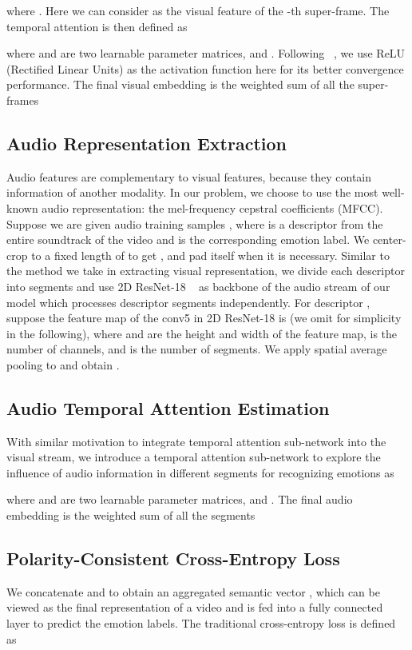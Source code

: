 \documentclass[letterpaper]{article} \usepackage{aaai20}  \usepackage{times}  \usepackage{helvet} \usepackage{courier}  \usepackage[hyphens]{url}  \usepackage{graphicx} \urlstyle{rm} \def\UrlFont{\rm}  \usepackage{graphicx}
\begin{document}
where . Here we can consider  as the visual feature of the -th super-frame. The temporal attention is then defined as

where  and  are two learnable parameter matrices, and . Following ~\cite{song2017end}, we use ReLU (Rectified Linear Units) as the activation function here for its better convergence performance. The final visual embedding is the weighted sum of all the super-frames



\subsection{Audio Representation Extraction}
Audio features are complementary to visual features, because they contain information of another modality. In our problem, we choose to use the most well-known audio representation: the mel-frequency cepstral coefficients (MFCC). Suppose we are given  audio training samples , where  is a descriptor from the entire soundtrack of the video  and  is the corresponding emotion label. We center-crop  to a fixed length of  to get , and pad itself when it is necessary. Similar to the method we take in extracting visual representation, we divide each descriptor into  segments and use 2D ResNet-18 ~\cite{he2016deep} as backbone of the audio stream of our model which processes descriptor segments independently. For descriptor , suppose the feature map of the conv5 in 2D ResNet-18 is  (we omit  for simplicity in the following), where  and  are the height and width of the feature map,  is the number of channels, and  is the number of segments. We apply spatial average pooling to  and obtain .

\subsection{Audio Temporal Attention Estimation}
With similar motivation to integrate temporal attention sub-network into the visual stream, we introduce a temporal attention sub-network to explore the influence of audio information in different segments for recognizing emotions as

where  and  are two learnable parameter matrices, and . The final audio embedding is the weighted sum of all the segments




\subsection{Polarity-Consistent Cross-Entropy Loss}
\label{ssec:PCCE}
We concatenate  and  to obtain an aggregated semantic vector  , which can be viewed as the final representation of a video and is fed into a fully connected layer to predict the emotion labels. The traditional cross-entropy loss is defined as
\end{document}
